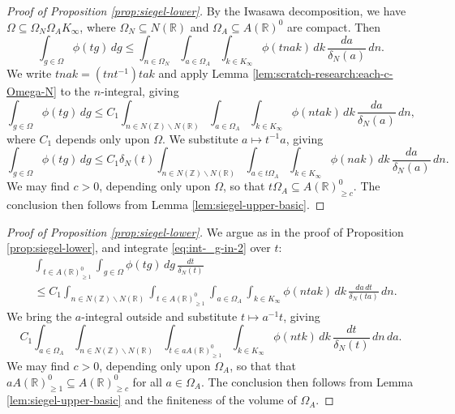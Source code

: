 \documentclass[reqno]{amsart}
\theoremstyle{plain} \newtheorem{theorem} {Theorem}
\theoremstyle{definition} \newtheorem{definition} [theorem] {Definition}
\theoremstyle{itplain} %
\numberwithin{equation}{section}
\numberwithin{theorem}{section}
\renewcommand{\geq}{\geqslant}
\renewcommand{\leq}{\leqslant}
\begin{document}
\begin{proof}[Proof of Proposition \ref{prop:siegel-lower}]
  By the Iwasawa decomposition, we have $\Omega \subseteq \Omega_N \Omega_A K_\infty$, where $\Omega_N \subseteq N(\mathbb{R})$ and $\Omega_A \subseteq A(\mathbb{R})^0$ are compact.  Then
  \begin{equation*}
    \int _{g \in \Omega } \phi(t g) \, d g
    \leq
    \int _{n \in \Omega_N}
    \int _{a \in \Omega_A}
    \int _{k \in K_\infty }
    \phi(t n a k)
    \, d k \, \frac{d a}{\delta_N(a)}  \, d n.
  \end{equation*}
  We write $t n a k = (t n t^{-1}) t a k$ and apply Lemma \ref{lem:scratch-research:each-c-Omega-N} to the $n$-integral, giving
  \begin{equation}\label{eq:int-_g-in-2}
    \int _{g \in \Omega } \phi(t g) \, d g \leq
    C_1 \int _{n \in N(\mathbb{Z}) \backslash N(\mathbb{R})}
    \int _{a \in \Omega_A } \int _{k \in K_\infty } \phi(n t a k)
    \, d k
    \, \frac{d a}{\delta_N(a)}
    \, d n,
  \end{equation}
  where $C_1$ depends only upon $\Omega$.  We substitute $a \mapsto t^{-1} a$, giving
  \begin{equation*}
    \int _{g \in \Omega } \phi(t g) \, d g \leq
    C_1 \delta_N(t) \int _{n \in N(\mathbb{Z}) \backslash N(\mathbb{R})}
    \int _{a \in t \Omega_A } \int _{k \in K_\infty } \phi(n a k)
    \, d k
    \, \frac{d a}{\delta_N(a)}
    \, d n.
  \end{equation*}
  We may find $c > 0$, depending only upon $\Omega$, so that $t \Omega_A \subseteq A(\mathbb{R})_{\geq c}^0$.  The conclusion then follows from Lemma \ref{lem:siegel-upper-basic}.
\end{proof}
\begin{proof}[Proof of Proposition \ref{prop:siegel-lower}]
  We argue as in the proof of Proposition \ref{prop:siegel-lower}, and integrate \eqref{eq:int-_g-in-2} over $t$:
  \begin{align*}
    &\int_{t \in A(\mathbb{R})^0_{\geq 1}} \int _{g \in \Omega } \phi(t g) \, d g \, \frac{d t}{\delta_N(t)} \\
    &\leq
    C_1 \int _{n \in N(\mathbb{Z}) \backslash N(\mathbb{R})}
    \int _{t \in A(\mathbb{R})^0_{\geq 1}}
      \int _{a \in \Omega_A } \int _{k \in K_\infty } \phi(n t a k)
      \, d k
      \, \frac{d a \, d t}{\delta_N(t a)}
      \, d n.
  \end{align*}
  We bring the $a$-integral outside and substitute $t \mapsto a^{-1} t$, giving
  \begin{equation*}
    C_1
    \int _{a \in \Omega_A }
    \int _{n \in N(\mathbb{Z}) \backslash N(\mathbb{R})}
    \int _{t \in a A(\mathbb{R})^0_{\geq 1}}
    \int _{k \in K_\infty } \phi(n t k)
      \, d k
      \, \frac{d t}{\delta_N(t)}
      \, d n \, d a.
  \end{equation*}
  We may find $c > 0$, depending only upon $\Omega_A$, so that that $a A(\mathbb{R})_{\geq 1}^0 \subseteq A(\mathbb{R})_{\geq c}^0$ for all $a \in \Omega_A$.  The conclusion then follows from Lemma \ref{lem:siegel-upper-basic} and the finiteness of the volume of $\Omega_A$.
\end{proof}
\end{document}
